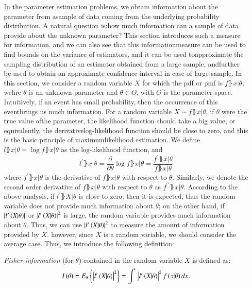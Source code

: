 In the parameter estimation problems, we obtain information about the parameter from asample of data coming from the underlying probability distribution. 
A natural question is:how much information can a sample of data provide about the unknown parameter? 
This section introduces such a measure for information, and we can also see that this informationmeasure can be used to find bounds on the variance of estimators, and it can be used toapproximate the sampling distribution of an estimator obtained from a large sample, andfurther be used to obtain an approximate confidence interval in case of large sample.
In this section, we consider a random variable $X$ for which the pdf or pmf is $f\rBrace{x|\theta}$, wehre $\theta$ is an unknown parameter and $\theta\in\Theta$, with $\Theta$ is the parameter space.
Intuitively, if an event has small probability, then the occurrence of this eventbrings us much information. 
For a random variable $X \sim f\rBrace{x|\theta}$, if $\theta$ were the true value ofthe parameter, the likelihood function should take a big value, or equivalently, the derivativelog-likelihood function should be close to zero, and this is the basic principle of maximumlikelihood estimation.
We define $l\rBrace{x|\theta} = \log{f\rBrace{x|\theta}}$ as the log-likelihood function, and
\begin{equation*}
    l^{\prime}\rBrace{x|\theta} = \frac{\partial}{\partial\theta}\log{f\rBrace{x|\theta}}=\frac{f^{\prime}\rBrace{x|\theta}}{f\rBrace{x|\theta}}
\end{equation*}
where $f^{\prime}\rBrace{x|\theta}$ is the derivative of $f\rBrace{x|\theta}$ with respect to $\theta$.
Similarly, we denote the second order derivative of $f\rBrace{x|\theta}$ with respect to $\theta$ as $f^{\prime\prime}\rBrace{x|\theta}$.
According to the above analysis, if $l^{\prime}\rBrace{X|\theta}$ is close to zero, then it is expected, thus the random variable does not provide much information about $\theta$;
on the other hand, if $\left\vert l^{\prime}\left({X|\theta}\right)\right\vert$ or $\left\vert l^{\prime}\left({X|\theta}\right)\right\vert^{2}$ is large, the random variable provides much information about $\theta$.
Thus, we can use $\left\vert l^{\prime}\left({X|\theta}\right)\right\vert^{2}$ to measure the amount of information provided by $X$.
however, since $X$ is a random variable, we should consider the average case. Thus, we introduce the following definition:
\begin{definition}
\emph{Fisher information} (for $\theta$) contained in the random variable $X$ is defined as:
\begin{equation}
\label{eq_prlm_FI_def}
    I\left({\theta}\right)=E_{\theta}\left\{{\left\vert l^{\prime}\left({X|\theta}\right)\right\vert^{2}}\right\}=\int{}\left\vert l^{\prime}\left({X|\theta}\right)\right\vert^{2}f\left({x|\theta}\right)dx.
\end{equation}
\end{definition}
